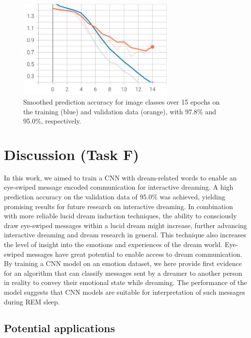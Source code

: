\documentclass{article}
\begin{document}
\begin{figure}[H]
\centering
\includegraphics[width=0.7\textwidth]{fig2.jpg}
\caption{\label{fig:fig2} Smoothed prediction accuracy for image classes over 15 epochs on the training (blue) and validation data (orange), with 97.8\% and 95.0\%, respectively.}
\end{figure}



\section{Discussion (Task F)}

In this work, we aimed to train a CNN with dream-related words to enable an eye-swiped message encoded communication for interactive dreaming. A high prediction accuracy on the validation data of 95.0\% was achieved, yielding promising results for future research on interactive dreaming. In combination with more reliable lucid dream induction techniques, the ability to consciously draw eye-swiped messages within a lucid dream might increase, further advancing interactive dreaming and dream research in general. This technique also increases the level of insight into the emotions and experiences of the dream world. Eye-swiped messages have great potential to enable access to dream communication. By training a CNN model on an emotion dataset, we here provide first evidence for an algorithm that can classify messages sent by a dreamer to another person in reality to convey their emotional state while dreaming. The performance of the model suggests that CNN models are suitable for interpretation of such messages during REM sleep.

\subsection*{Potential applications}
\end{document}
